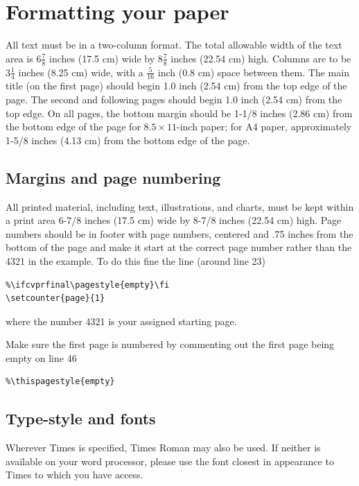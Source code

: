 \documentclass[10pt,twocolumn,letterpaper]{article}
\begin{document}
\section{Formatting your paper}

All text must be in a two-column format. The total allowable width of the
text area is $6\frac78$ inches (17.5 cm) wide by $8\frac78$ inches (22.54
cm) high. Columns are to be $3\frac14$ inches (8.25 cm) wide, with a
$\frac{5}{16}$ inch (0.8 cm) space between them. The main title (on the
first page) should begin 1.0 inch (2.54 cm) from the top edge of the
page. The second and following pages should begin 1.0 inch (2.54 cm) from
the top edge. On all pages, the bottom margin should be 1-1/8 inches (2.86
cm) from the bottom edge of the page for $8.5 \times 11$-inch paper; for A4
paper, approximately 1-5/8 inches (4.13 cm) from the bottom edge of the
page.

\subsection{Margins and page numbering}

All printed material, including text, illustrations, and charts, must be kept
within a print area 6-7/8 inches (17.5 cm) wide by 8-7/8 inches (22.54 cm)
high.
Page numbers should be in footer with page numbers, centered and .75
inches from the bottom of the page and make it start at the correct page
number rather than the 4321 in the example.  To do this fine the line (around
line 23)
\begin{verbatim}
%\ifcvprfinal\pagestyle{empty}\fi
\setcounter{page}{1}
\end{verbatim}
where the number 4321 is your assigned starting page.

Make sure the first page is numbered by commenting out the first page being
empty on line 46
\begin{verbatim}
%\thispagestyle{empty}
\end{verbatim}


\subsection{Type-style and fonts}

Wherever Times is specified, Times Roman may also be used. If neither is
available on your word processor, please use the font closest in
appearance to Times to which you have access.
\end{document}
